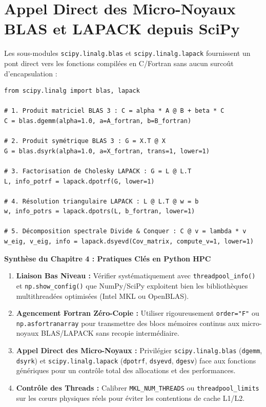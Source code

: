 \documentclass[11pt,a4paper]{report}
\theoremstyle{plain}
\theoremstyle{definition}
\theoremstyle{remark}
\begin{document}
\section{Appel Direct des Micro-Noyaux BLAS et LAPACK depuis SciPy}
Les sous-modules \texttt{scipy.linalg.blas} et \texttt{scipy.linalg.lapack} fournissent un pont direct vers les fonctions compilées en C/Fortran sans aucun surcoût d'encapsulation :

\begin{lstlisting}
from scipy.linalg import blas, lapack

# 1. Produit matriciel BLAS 3 : C = alpha * A @ B + beta * C
C = blas.dgemm(alpha=1.0, a=A_fortran, b=B_fortran)

# 2. Produit symétrique BLAS 3 : G = X.T @ X
G = blas.dsyrk(alpha=1.0, a=X_fortran, trans=1, lower=1)

# 3. Factorisation de Cholesky LAPACK : G = L @ L.T
L, info_potrf = lapack.dpotrf(G, lower=1)

# 4. Résolution triangulaire LAPACK : L @ L.T @ w = b
w, info_potrs = lapack.dpotrs(L, b_fortran, lower=1)

# 5. Décomposition spectrale Divide & Conquer : C @ v = lambda * v
w_eig, v_eig, info = lapack.dsyevd(Cov_matrix, compute_v=1, lower=1)
\end{lstlisting}

\begin{tcolorbox}[colback=navyblue!5!white,colframe=navyblue!80!black,arc=3pt,boxrule=0.8pt]
\textbf{\large Synthèse du Chapitre 4 : Pratiques Clés en Python HPC}
\begin{enumerate}
    \item \textbf{Liaison Bas Niveau :} Vérifier systématiquement avec \texttt{threadpool\_info()} et \texttt{np.show\_config()} que NumPy/SciPy exploitent bien les bibliothèques multithreadées optimisées (Intel MKL ou OpenBLAS).
    \item \textbf{Agencement Fortran Zéro-Copie :} Utiliser rigoureusement \texttt{order="F"} ou \texttt{np.asfortranarray} pour transmettre des blocs mémoires continus aux micro-noyaux BLAS/LAPACK sans recopie intermédiaire.
    \item \textbf{Appel Direct des Micro-Noyaux :} Privilégier \texttt{scipy.linalg.blas} (\texttt{dgemm}, \texttt{dsyrk}) et \texttt{scipy.linalg.lapack} (\texttt{dpotrf}, \texttt{dsyevd}, \texttt{dgesv}) face aux fonctions génériques pour un contrôle total des allocations et des performances.
    \item \textbf{Contrôle des Threads :} Calibrer \texttt{MKL\_NUM\_THREADS} ou \texttt{threadpool\_limits} sur les cœurs physiques réels pour éviter les contentions de cache L1/L2.
\end{enumerate}
\end{tcolorbox}
\end{document}
